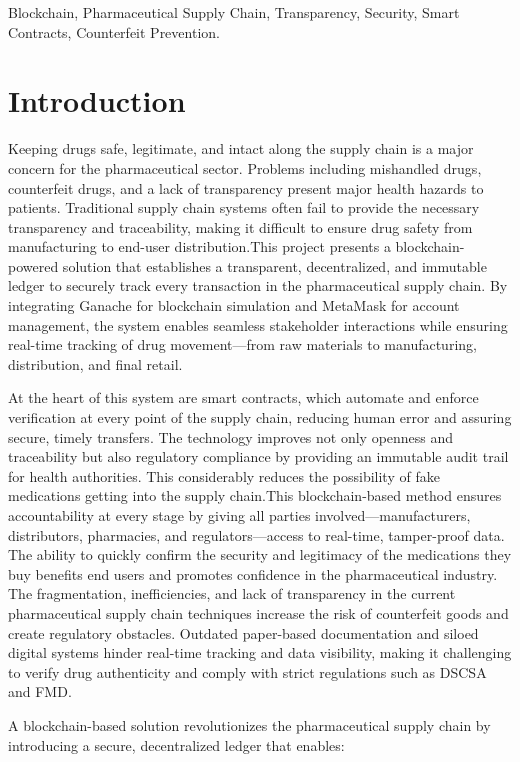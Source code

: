 \documentclass[conference]{IEEEtran}
\begin{document}
\begin{IEEEkeywords}
Blockchain, Pharmaceutical Supply Chain, Transparency, Security, Smart Contracts, Counterfeit Prevention.
\end{IEEEkeywords}

\section{Introduction}
Keeping drugs safe, legitimate, and intact along the supply chain is a major concern for the pharmaceutical sector. Problems including mishandled drugs, counterfeit drugs, and a lack of transparency present major health hazards to patients.  Traditional supply chain systems often fail to provide the necessary transparency and traceability, making it difficult to ensure drug safety from manufacturing to end-user distribution.This project presents a blockchain-powered solution that establishes a transparent, decentralized, and immutable ledger to securely track every transaction in the pharmaceutical supply chain. By integrating Ganache for blockchain simulation and MetaMask for account management, the system enables seamless stakeholder interactions while ensuring real-time tracking of drug movement—from raw materials to manufacturing, distribution, and final retail.

At the heart of this system are smart contracts, which automate and enforce verification at every point of the supply chain, reducing human error and assuring secure, timely transfers. The technology improves not only openness and traceability but also regulatory compliance by providing an immutable audit trail for health authorities. This considerably reduces the possibility of fake medications getting into the supply chain.This blockchain-based method ensures accountability at every stage by giving all parties involved—manufacturers, distributors, pharmacies, and regulators—access to real-time, tamper-proof data. The ability to quickly confirm the security and legitimacy of the medications they buy benefits end users and promotes confidence in the pharmaceutical industry. The fragmentation, inefficiencies, and lack of transparency in the current pharmaceutical supply chain techniques increase the risk of counterfeit goods and create regulatory obstacles. Outdated paper-based documentation and siloed digital systems hinder real-time tracking and data visibility, making it challenging to verify drug authenticity and comply with strict regulations such as DSCSA and FMD.

A blockchain-based solution revolutionizes the pharmaceutical supply chain by introducing a secure, decentralized ledger that enables:
\end{document}
